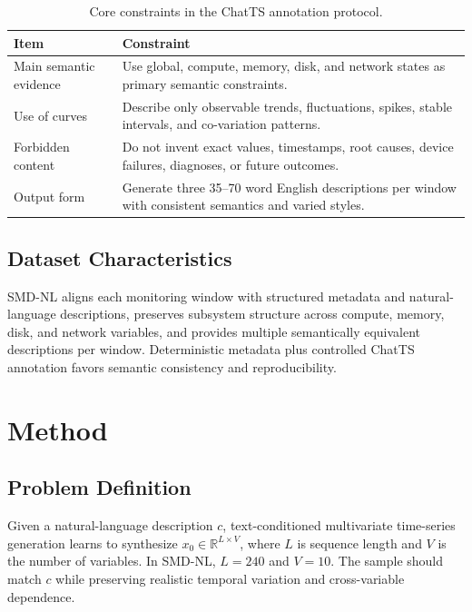 \documentclass[conference]{IEEEtran}
\begin{document}
\begin{table}[t]
\centering
\caption{Core constraints in the ChatTS annotation protocol.}
\label{tab:annotation}
\begin{tabular}{p{}p{}}
\toprule
Item & Constraint \\
\midrule
Main semantic evidence & Use global, compute, memory, disk, and network states as primary semantic constraints. \\
Use of curves & Describe only observable trends, fluctuations, spikes, stable intervals, and co-variation patterns. \\
Forbidden content & Do not invent exact values, timestamps, root causes, device failures, diagnoses, or future outcomes. \\
Output form & Generate three 35--70 word English descriptions per window with consistent semantics and varied styles. \\
\bottomrule
\end{tabular}
\end{table}

\subsection{Dataset Characteristics}

SMD-NL aligns each monitoring window with structured metadata and natural-language descriptions, preserves subsystem structure across compute, memory, disk, and network variables, and provides multiple semantically equivalent descriptions per window. Deterministic metadata plus controlled ChatTS annotation favors semantic consistency and reproducibility.

\section{Method}

\subsection{Problem Definition}

Given a natural-language description $c$, text-conditioned multivariate time-series generation learns to synthesize $x_0\in\mathbb{R}^{L\times V}$, where $L$ is sequence length and $V$ is the number of variables. In SMD-NL, $L=240$ and $V=10$. The sample should match $c$ while preserving realistic temporal variation and cross-variable dependence.
\end{document}
